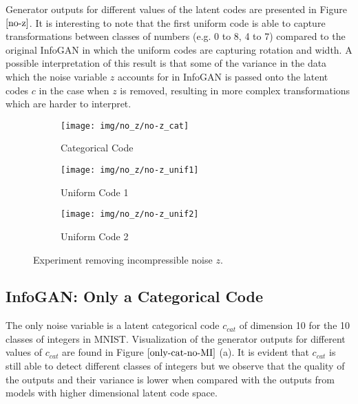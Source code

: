 \documentclass{article}
\begin{document}
Generator outputs for different values of the latent codes are presented in Figure $\ref{no-z}$. It is interesting to note that the first uniform code is able to capture transformations between classes of numbers (e.g. 0 to 8, 4 to 7) compared to the original InfoGAN in which the uniform codes are capturing rotation and width. A possible interpretation of this result is that some of the variance in the data which the noise variable $z$ accounts for in InfoGAN is passed onto the latent codes $c$ in the case when $z$ is removed, resulting in more complex transformations which are harder to interpret.

\begin{figure}[ht]
\centering
\begin{subfigure}{.33\textwidth}
  \centering
  \texttt{[image: img/no\_z/no-z\_cat]}
  \caption{Categorical Code}
  \label{fig:sub1}
\end{subfigure}%
\begin{subfigure}{.33\textwidth}
  \centering
  \texttt{[image: img/no\_z/no-z\_unif1]}
  \caption{Uniform Code 1}
  \label{fig:sub2}
\end{subfigure}
\begin{subfigure}{.33\textwidth}
  \centering
  \texttt{[image: img/no\_z/no-z\_unif2]}
  \caption{Uniform Code 2}
  \label{fig:sub3}
\end{subfigure}
\caption{Experiment removing incompressible noise $z$.}
\label{no-z}
\end{figure}

\subsection{InfoGAN: Only a Categorical Code}
The only noise variable is a latent categorical code $c_{cat}$ of dimension 10 for the 10 classes of integers in MNIST. Visualization of the generator outputs for different values of $c_{cat}$ are found in Figure $\ref{only-cat-no-MI}$ (a). It is evident that $c_{cat}$ is still able to detect different classes of integers but we observe that the quality of the outputs and their variance is lower when compared with the outputs from models with higher dimensional latent code space. 
\end{document}
